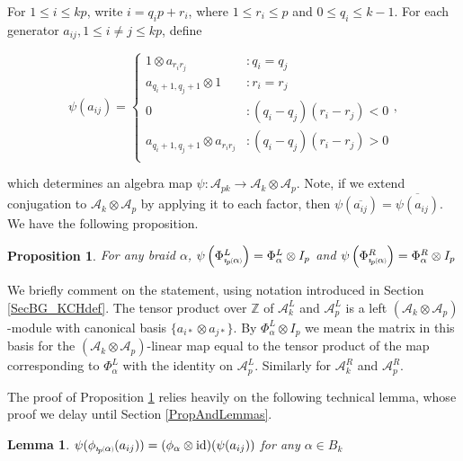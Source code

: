 \documentclass[11pt]{amsart}
\def\Z{{\mathbb Z}}
\def\A{{\mathcal A}}
\newcommand*{\subsmallp}[1]{\scalebox{.5}{\ensuremath#1}}
\newcommand{\subpp}[2][p]{\imath_{\hspace*{-1pt}#1}\hspace*{-.5pt}\subsmallp(#2\subsmallp)}
\newcommand\id{\operatorname{id}}
\newtheorem{lem}[thm]{Lemma}
\newtheorem{prop}[thm]{Proposition}
\theoremstyle{definition}
\begin{document}
For $1\le i\le kp$, write $i = q_ip + r_i$, where $1\le r_i \le p$ and $0\le q_i\le k-1$.  For each generator $a_{ij}, 1\le i\ne j\le kp$, define

\begin{equation}
\psi(a_{ij}) =
  \begin{cases}
         1\otimes a_{r_ir_j} & \colon q_i = q_j\\
         a_{q_i+1,q_j+1}\otimes 1 & \colon r_i = r_j\\
         0 & \colon (q_i-q_j)(r_i-r_j)<0\\
         a_{q_i+1,q_j+1}\otimes a_{r_ir_j} & \colon (q_i-q_j)(r_i-r_j)>0\\
  \end{cases},
  \label{defn:psi}
\end{equation}

\noindent which determines an algebra map $\psi\colon \A_{pk} \rightarrow \A_k\otimes \A_p$. Note, if we extend conjugation to $\A_k\otimes\A_p$ by applying it to each factor, then $\psi(\overline{a_{ij}}) = \overline{\psi(a_{ij})}$. We have the following proposition.

\begin{prop}\label{psiofbp}
For any braid $\alpha$, $\psi\left(\Phi_{\subpp\alpha}^L\right) = \Phi_\alpha^L\otimes I_p$ and $\psi\left(\Phi_{\subpp\alpha}^R\right) = \Phi_\alpha^R\otimes I_p$
\end{prop}

We briefly comment on the statement, using notation introduced in Section \ref{SecBG_KCHdef}. The tensor product over $\Z$ of $\A_k^L$ and $\A_p^L$ is a left $(\A_k\otimes\A_p)$-module with canonical basis $\{a_{i\ast}\otimes a_{j\ast}\}$. By $\Phi_\alpha^L\otimes I_p$ we mean the matrix in this basis for the $(\A_k\otimes\A_p)$-linear map equal to the tensor product of the map corresponding to $\Phi_\alpha^L$ with the identity on $\A_p^L$. Similarly for $\A_k^R$ and $\A_p^R$.

The proof of Proposition \ref{psiofbp} relies heavily on the following technical lemma, whose proof we delay until Section \ref{PropAndLemmas}.

\begin{lem}\label{commutes}
$\psi(\phi_{\subpp\alpha}(a_{ij})) = (\phi_{\alpha} \otimes \id)(\psi(a_{ij}))$ for any $\alpha\in B_k$
\end{lem}
\end{document}
